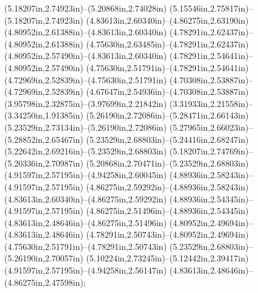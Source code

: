 (5.18207in,2.74923in)--(5.20868in,2.74028in) (5.15546in,2.75817in)--(5.18207in,2.74923in) (4.83613in,2.60340in)--(4.86275in,2.63190in) (4.80952in,2.61388in)--(4.83613in,2.60340in) (4.78291in,2.62437in)--(4.80952in,2.61388in) (4.75630in,2.63485in)--(4.78291in,2.62437in) (4.80952in,2.57490in)--(4.83613in,2.60340in) (4.78291in,2.54641in)--(4.80952in,2.57490in) (4.75630in,2.51791in)--(4.78291in,2.54641in) (4.72969in,2.52839in)--(4.75630in,2.51791in) (4.70308in,2.53887in)--(4.72969in,2.52839in) (4.67647in,2.54936in)--(4.70308in,2.53887in) (3.95798in,2.32875in)--(3.97699in,2.21842in) (3.31933in,2.21558in)--(3.34250in,1.91385in) (5.26190in,2.72086in)--(5.28471in,2.66143in) (5.23529in,2.73134in)--(5.26190in,2.72086in) (5.27965in,2.66023in)--(5.28852in,2.65467in) (5.23529in,2.68803in)--(5.24416in,2.68247in) (5.22642in,2.69216in)--(5.23529in,2.68803in) (5.18207in,2.74769in)--(5.20336in,2.70987in) (5.20868in,2.70471in)--(5.23529in,2.68803in) (4.91597in,2.57195in)--(4.94258in,2.60045in) (4.88936in,2.58243in)--(4.91597in,2.57195in) (4.86275in,2.59292in)--(4.88936in,2.58243in) (4.83613in,2.60340in)--(4.86275in,2.59292in) (4.88936in,2.54345in)--(4.91597in,2.57195in) (4.86275in,2.51496in)--(4.88936in,2.54345in) (4.83613in,2.48646in)--(4.86275in,2.51496in) (4.80952in,2.49694in)--(4.83613in,2.48646in) (4.78291in,2.50743in)--(4.80952in,2.49694in) (4.75630in,2.51791in)--(4.78291in,2.50743in) (5.23529in,2.68803in)--(5.26190in,2.70057in) (5.10224in,2.73245in)--(5.12442in,2.39417in) (4.91597in,2.57195in)--(4.94258in,2.56147in) (4.83613in,2.48646in)--(4.86275in,2.47598in);
